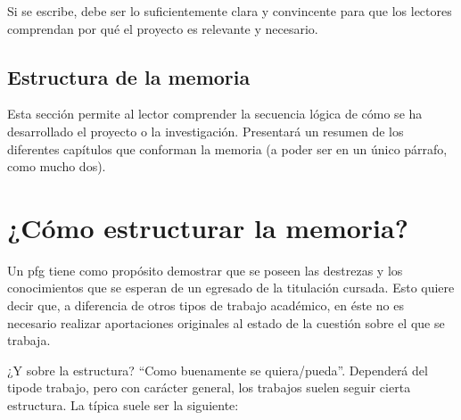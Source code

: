 \documentclass[%
    school=etsisi,%
    degree=61TI,%
]{upm-report}
\begin{document}
Si se escribe, debe ser lo suficientemente clara y convincente para que
los lectores comprendan por qué el proyecto es relevante y necesario.

\section{Estructura de la memoria}

Esta sección permite al lector comprender la secuencia lógica de cómo se
ha desarrollado el proyecto o la investigación. Presentará un resumen de
los diferentes capítulos que conforman la memoria (a poder ser en un
único párrafo, como mucho dos).

\chapter{¿Cómo estructurar la memoria?}
\label{s:como-estructurar}

Un \gls{pfg} tiene como propósito demostrar que se poseen las destrezas
y los conocimientos que se esperan de un egresado de la titulación
cursada. Esto quiere decir que, a diferencia de otros tipos de trabajo
académico, en éste no es necesario realizar aportaciones originales al
estado de la cuestión sobre el que se trabaja.

¿Y sobre la estructura? \enquote{Como buenamente se quiera/pueda}.
Dependerá del tipode trabajo, pero con carácter general, los trabajos
suelen seguir cierta estructura. La típica suele ser la siguiente:
\end{document}
